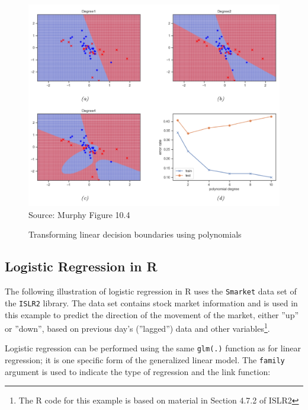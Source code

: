 \begin{figure}
\centering
\includegraphics[width=.8\textwidth]{screen3.png} \\
\scriptsize Source: Murphy Figure 10.4
\caption{Transforming linear decision boundaries using polynomials}
\label{fig:nonlinearboundary2}
\end{figure}

\subsection{Logistic Regression in R}

The following illustration of logistic regression in R uses the \texttt{Smarket} data set of the \texttt{ISLR2} library. The data set contains stock market information and is used in this example to predict the direction of the movement of the market, either ''up'' or ''down'', based on previous day's (''lagged'') data and other variables\footnote{The R code for this example is based on material in Section 4.7.2 of ISLR2}. 

Logistic regression can be performed using the same \texttt{glm(.)} function as for linear regression; it is one specific form of the generalized linear model. The \texttt{family} argument is used to indicate the type of regression and the link function:

\begin{samepage}
\end{samepage}

